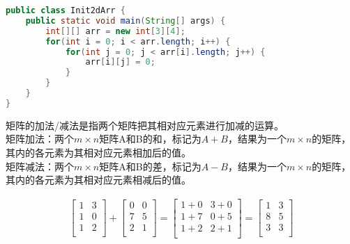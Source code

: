 \begin{lstlisting}[language=Java]
public class Init2dArr {
    public static void main(String[] args) {
        int[][] arr = new int[3][4];
        for(int i = 0; i < arr.length; i++) {
            for(int j = 0; j < arr[i].length; j++) {
                arr[i][j] = 0;
            }
        }
    }
}
\end{lstlisting}

\vspace{0.5cm}


\vspace{0.5cm}

矩阵的加法/减法是指两个矩阵把其相对应元素进行加减的运算。 \\

矩阵加法：两个$ m \times n $矩阵A和B的和，标记为$ A + B $，结果为一个$ m \times n $的矩阵，其内的各元素为其相对应元素相加后的值。 \\

矩阵减法：两个$ m \times n $矩阵A和B的差，标记为$ A - B $，结果为一个$ m \times n $的矩阵，其内的各元素为其相对应元素相减后的值。

\begin{align}\nonumber
	\left[\begin{matrix}
			1 & 3 \\
			1 & 0 \\
			1 & 2 \\
		\end{matrix} \right]
	+
	\left[\begin{matrix}
			0 & 0 \\
			7 & 5 \\
			2 & 1 \\
		\end{matrix} \right]
	=
	\left[\begin{matrix}
			1+0 & 3+0 \\
			1+7 & 0+5 \\
			1+2 & 2+1 \\
		\end{matrix} \right]
	=
	\left[\begin{matrix}
			1 & 3 \\
			8 & 5 \\
			3 & 3 \\
		\end{matrix} \right]
\end{align}

